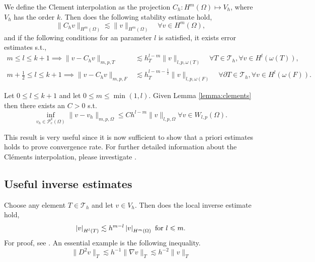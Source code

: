 \begin{lemma}
    \label{lemma:clements}

We define the Clement interpolation as the projection
$C_{h}: H^{m} \left( \Omega  \right) \mapsto V_{h}$, where $V_{h}$ has the order $k$. Then does the following stability estimate hold,
\[
 \| C_{h} v \|_{H^{m}\left( \Omega  \right)   }^{  } \lesssim \| v \|_{ H^{m}\left( \Omega  \right)  }^{  } \quad \forall v \in H^{m}\left( \Omega  \right),
\]
and if the following conditions for an parameter $l$ is satisfied, it exists error estimates s.t.,
\[
    \begin{split}
      m\le l \le k+1  \implies \| v - C_{h} v \|_{ m,p,T   }^{  }  &  \lesssim h^{l-m}_{T} \| v \|_{l,p,\omega \left( T \right)  }^{  } \quad  \forall T \in \mathcal{T} _{h}, \forall v \in H^{l}( \omega \left( T \right)
      ), \\
      m +\frac{1}{2}\le l \le k+1  \implies \| v - C_{h} v \|_{ m,p,F }^{  } & \lesssim h^{l-m- \frac{1}{2}}_{T} \| v \|_{l,p,\omega \left( F \right)  }^{  } \quad  \forall \partial T \in \mathcal{T} _{h}, \forall v \in H^{l}( \omega \left( F
      \right)).
    \end{split}
\]

\end{lemma}


\begin{corollary}
    \label{cor:celement_apriori}
    Let $0 \le l \le k+1$ and let $0\le m \le \min_{} ( 1,l )$.
    Given Lemma \ref{lemma:clements}  then there exists an $C > 0$ s.t.
    \[
    \inf_{v_{h} \in \mathcal{P} ^{k}_{c}( \Omega ) } \| v - v_{h} \|_{  m,p,\Omega }^{  } \le C h^{l-m}  \| v \|_{ l,p,\Omega  }^{  }    \forall v \in W_{l,p}( \Omega ).
    \]
\end{corollary}
This result is very useful since it is now sufficient to show that a priori estimates holds to prove convergence rate. For further detailed information about the Cléments interpolation, please investigate \cite[Chapter 1.6]{ern04}.

\subsection{Useful inverse estimates}%
\label{sub:some_general_inequalities}


Choose any element $T \in \mathcal{T}_{h} $ and let $v \in V_{h}  $. Then does the local inverse estimate hold,
\begin{equation}
\label{eq:inv1}
\left\lvert  v  \right\rvert_{H^{l}( T) }  \lesssim h^{m-l} \left\lvert  v  \right\rvert_{H^{m}( \Omega ) }
\text{ for } l \leqslant m.
\end{equation}
 For proof, see \cite[Lemma 12.1]{ErnGuermond2021}. An essential example is the following inequality.
$$\| D^2v \|_{T  }^{  } \lesssim h^{-1} \| \nabla v  \|_{ T  }^{  } \lesssim h^{-2} \| v \|_{T  }^{  }   $$


